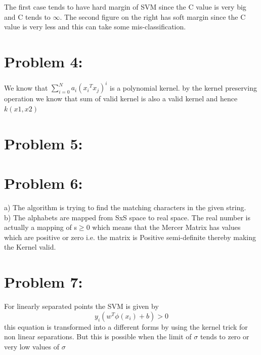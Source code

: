 \documentclass[5pt,a4paper]{article}
\begin{document}
The first case tends to have hard margin of SVM since the C value is very big and C tends to $\infty$. The second figure on the right has soft margin since the C value is very less and this can take some mis-classification.\\ 
	
	\section*{Problem 4:}
	We know that $ \sum_{i=0}^{N} a_i({x_i}^T {x_j})^i $ is a polynomial kernel. by the kernel preserving operation we know that sum of valid kernel is also a valid kernel and hence $k(x1,x2)$
	
	\section*{Problem 5:}
	\section*{Problem 6:}
	a) The algorithm is trying to find the matching characters in the given string.\\
	b) The alphabets are mapped from SxS space to real space. The real number is actually a mapping of s$ \ge$0 which means that the Mercer Matrix has values which are positive or zero i.e. the matrix is Positive semi-definite thereby making the Kernel valid. 
	\section*{Problem 7:}
	For linearly separated points the SVM is given by 
	\begin{equation}
	y_i(w^T \phi(x_i)+b) > 0 
	\end{equation} this equation is transformed into a different forms by using the kernel trick for non linear separations. But this is possible when the limit of $\sigma$ tends to zero or very low values of $\sigma$
	
	
\end{document}

